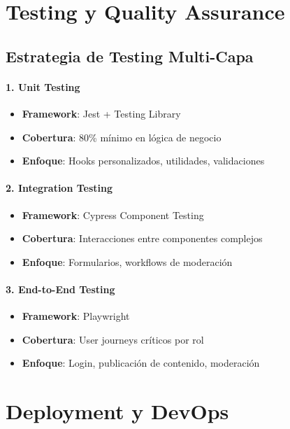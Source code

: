 \documentclass[12pt,a4paper]{article}
\begin{document}
\section{Testing y Quality Assurance}

\subsection{Estrategia de Testing Multi-Capa}

\paragraph{1. Unit Testing}
\begin{itemize}
    \item \textbf{Framework}: Jest + Testing Library
    \item \textbf{Cobertura}: 80\% mínimo en lógica de negocio
    \item \textbf{Enfoque}: Hooks personalizados, utilidades, validaciones
\end{itemize}

\paragraph{2. Integration Testing}
\begin{itemize}
    \item \textbf{Framework}: Cypress Component Testing
    \item \textbf{Cobertura}: Interacciones entre componentes complejos
    \item \textbf{Enfoque}: Formularios, workflows de moderación
\end{itemize}

\paragraph{3. End-to-End Testing}
\begin{itemize}
    \item \textbf{Framework}: Playwright
    \item \textbf{Cobertura}: User journeys críticos por rol
    \item \textbf{Enfoque}: Login, publicación de contenido, moderación
\end{itemize}

\section{Deployment y DevOps}
\end{document}
